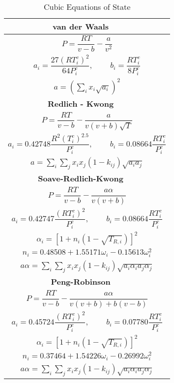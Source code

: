 \begin{table}
			\caption{Cubic Equations of State}\label{CubicEOSTable}
			\begin{center}
			\begin{tabular}{cc}
			\toprule
			\textbf{van der Waals}&\\
			\midrule
			\multicolumn{2}{c}{ $P = \dfrac{RT}{v - b} - \dfrac{a}{v^{2}}$}\\
			\multicolumn{2}{c}{$a_{i}  = \dfrac{27\left(RT_{i}^{c}\right)^{2}}{64P_{i}^{c}}$, $\qquad b_{i} = \dfrac{RT_{i}^{c}}{8P_{i}^{c}}$}\\
			\multicolumn{2}{c}{$a = \left(\sum_{i} x_{i} \sqrt{a_{i}}\right)^{2}$}\\
			\midrule
			\textbf{Redlich - Kwong }&\\
			\midrule
			\multicolumn{2}{c}{$P = \dfrac{RT}{v - b} - \dfrac{a}{v\left(v +b\right)\sqrt{T}}$}\\
			\multicolumn{2}{c}{$a_{i}  = 0.42748 \dfrac{R^{2}\left(T_{i}^{c}\right)^{2.5}}{P_{i}^{c}}$,  $\qquad b_{i} = 0.08664 \dfrac{RT_{i}^{c}}{P_{i}^{c}}$}\\
			\multicolumn{2}{c}{$a = \sum_{i}\sum_{j} x_{i}x_{j}\left(1-k_{ij}\right) \sqrt{a_{i}a_{j}} $}\\
			\midrule
			\textbf{Soave-Redlich-Kwong}  & \\
			\midrule
			\multicolumn{2}{c}{$P = \dfrac{RT}{v - b} - \dfrac{a \alpha }{v\left(v +b\right)}$}\\
			\multicolumn{2}{c}{$a_{i}  = 0.42747 \dfrac{\left(RT_{i}^{c}\right)^{2}}{P_{i}^{c}}$, $\qquad b_{i} = 0.08664 \dfrac{RT_{i}^{c}}{P_{i}^{c}}$}\\
			\multicolumn{2}{c}{$\alpha_{i} = \left[1+ n_{i}\left(1- \sqrt{T_{R,i}}\right)\right]^{2}$}\\
			\multicolumn{2}{c}{$n_{i} = 0.48508 + 1.55171 \omega_{i} - 0.15613 \omega_{i}^{2}$}\\
			\multicolumn{2}{c}{$a \alpha = \sum_{i}\sum_{j} x_{i}x_{j}\left(1-k_{ij}\right) \sqrt{a_{i} \alpha_{i}a_{j} \alpha_{j}} $}\\
			\midrule
			\textbf{Peng-Robinson}&\\
			\midrule
			\multicolumn{2}{c}{$P = \dfrac{RT}{v - b} - \dfrac{a \alpha}{v\left(v +b\right)+ b\left(v -b\right)}$}\\
			\multicolumn{2}{c}{$a_{i}  = 0.45724 \dfrac{\left(RT_{i}^{c}\right)^{2}}{P_{i}^{c}}$, $\qquad b_{i} = 0.07780 \dfrac{RT_{i}^{c}}{P_{i}^{c}}$}\\
			\multicolumn{2}{c}{$\alpha_{i} = \left[1+ n_{i}\left(1- \sqrt{T_{R,i}}\right)\right]^{2}$}\\
			\multicolumn{2}{c}{$n_{i} = 0.37464 + 1.54226 \omega_{i} - 0.26992 \omega_{i}^{2}$}\\
		    \multicolumn{2}{c}{$a \alpha = \sum_{i}\sum_{j} x_{i}x_{j}\left(1-k_{ij}\right) \sqrt{a_{i} \alpha_{i}a_{j} \alpha_{j}} $}\\
			\bottomrule			
			\end{tabular}
			\end{center}
\end{table}

